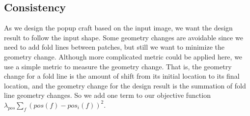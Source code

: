 \subsection{Consistency}
As we design the popup craft based on the input image, we want the design result to follow the input shape. Some geometry changes are avoidable since we need to add fold lines between patches, but still we want to minimize the geometry change. Although more complicated metric could be applied here, we use a simple metric to measure the geometry change. That is, the geometry change for a fold line is the amount of shift from its initial location to its final location, and the geometry change for the design result is the summation of fold line geometry changes. So we add one term to our objective function $\lambda_{pos}\sum_f(pos(f) - pos_i(f))^2$.